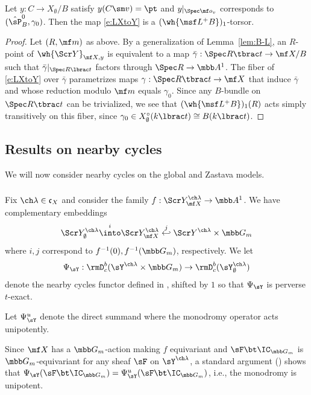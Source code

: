 \begin{prop}
\notready\label{prop:DGKtorsor}
Let $y : C\to X_\emptyset/B$ satisfy $y(C\sm v)=\pt$ and $y|_{\Spec \mf o_v}$ corresponds
to $(\hat\sP_B^0, \gamma_0)$.
Then the map \eqref{e:LXtoY} is a $(\wh{\msf L^+ B})_1$-torsor.
\end{prop}

\begin{proof}
Let $(R,\mf m)$ as above.
By a generalization of Lemma~\ref{lem:B-L}, an $R$-point of $\wh{\Scr Y}_{\mf X,y}$ is
equivalent to a map $\bar\gamma : \Spec R \tbrac t \to \mf X/B$ such that
$\bar\gamma|_{\Spec R\lbrac t}$ factors through $\Spec R \to \mbb A^1$.
The fiber of \eqref{e:LXtoY} over $\bar\gamma$ parametrizes
maps $\gamma : \Spec R \tbrac t \to \mf X$ that induce $\bar\gamma$
and whose reduction modulo $\mf m$ equals $\gamma_0$.
Since any $B$-bundle on $\Spec R\tbrac t$ can be trivialized,
we see that $(\wh{\msf L^+B})_1(R)$ acts simply transitively on this fiber, since
$\gamma_0 \in X^\circ_\emptyset(k\lbrac t)\cong B(k\lbrac t)$.
\end{proof}

\subsection{Results on nearby cycles} \label{sect:results-nearby}
We will now consider nearby cycles on the global and Zastava models.

\subsubsection{}
Fix $\ch\lambda \in \mathfrak c_X$ and consider the family
$f:\Scr Y^{\ch\lambda}_{\mf X} \to \mbb A^1$.
We have complementary embeddings
\[ \Scr Y^{\ch\lambda}_\emptyset \overset i\into \Scr Y^{\ch\lambda}_{\mf X} \overset j\hookleftarrow \Scr Y^{\ch\lambda} \times \mbb G_m \]
where $i,j$ correspond to $f^{-1}(0), f^{-1}(\mbb G_m)$, respectively.
We let
\[ \Psi_\sY : \rmD^b_c(\sY^{\ch\lambda} \times \mbb G_m) \to \rmD^b_c(\sY_\emptyset^{\ch\lambda})
\]
denote the nearby cycles functor
defined in \cite[Expos\'e XIII]{SGA7-2}, shifted by $1$ so that
$\Psi_\sY$ is perverse $t$-exact.

Let $\Psi_\sY^u$ denote the direct summand where the monodromy operator acts unipotently.
\begin{rem}
\notready
Since $\mf X$ has a $\mbb G_m$-action making $f$ equivariant
and $\sF \bt \IC_{\mbb G_m}$ is $\mbb G_m$-equivariant for any sheaf $\sF$ on $\sY^{\ch\lambda}$,
a standard argument (\cite[Remark 14]{AB}) shows that $\Psi_\sY(\sF \bt \IC_{\mbb G_m}) = \Psi_\sY^u(\sF \bt \IC_{\mbb G_m})$, i.e., the monodromy is unipotent.
\end{rem}

